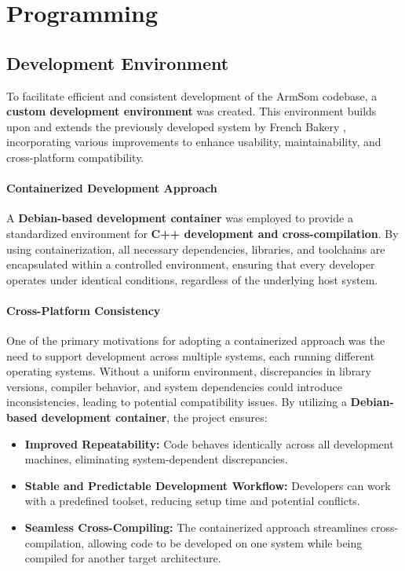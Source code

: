 
\section{Programming}
\subsection{Development Environment}  

To facilitate efficient and consistent development of the ArmSom codebase, a \textbf{custom development environment} was created. This environment builds upon and extends the previously developed system by French Bakery \cite{fb_dev_environment}, incorporating various improvements to enhance usability, maintainability, and cross-platform compatibility.  

\paragraph{Containerized Development Approach}  
A \textbf{Debian-based development container} was employed to provide a standardized environment for \textbf{C++ development and cross-compilation}. By using containerization, all necessary dependencies, libraries, and toolchains are encapsulated within a controlled environment, ensuring that every developer operates under identical conditions, regardless of the underlying host system.  

\paragraph{Cross-Platform Consistency}  
One of the primary motivations for adopting a containerized approach was the need to support development across multiple systems, each running different operating systems. Without a uniform environment, discrepancies in library versions, compiler behavior, and system dependencies could introduce inconsistencies, leading to potential compatibility issues. By utilizing a \textbf{Debian-based development container}, the project ensures:  
\begin{itemize}  
	\item \textbf{Improved Repeatability:} Code behaves identically across all development machines, eliminating system-dependent discrepancies.  
	\item \textbf{Stable and Predictable Development Workflow:} Developers can work with a predefined toolset, reducing setup time and potential conflicts.  
	\item \textbf{Seamless Cross-Compiling:} The containerized approach streamlines cross-compilation, allowing code to be developed on one system while being compiled for another target architecture.  
\end{itemize}  

